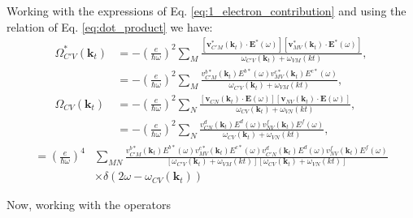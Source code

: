 \documentclass{article}
\newcommand{\kt}{\mathbf{k}_{t}}
\newcommand{\dw}{\delta(2\omega - \omega_{CV}(\kt))}
\begin{document}
Working with the expressions of Eq. \eqref{eq:1_electron_contribution} and using
the relation of Eq. \eqref{eq:dot_product} we have:
\begin{align*}\label{eq:omegaICV_omegaI*VpV}
\Omega^{*}_{C'V}(\kt) &= - \left(\frac{e}{\hbar\omega}\right)^{2}
\sum_{M} \frac{[\mathbf{v}^{*}_{C'M}(\kt) \cdot \mathbf{E}^{*}(\omega)]
[\mathbf{v}^{*}_{MV}(\kt)\cdot\mathbf{E}^{*}(\omega)]}{\omega_{C'V}(\kt)+\omega_{VM}(kt)}, \\
&= - \left(\frac{e}{\hbar\omega}\right)^{2}
\sum_{M} \frac{v^{b*}_{C'M}(\kt) E^{b*}(\omega)
v^{c*}_{MV}(\kt) E^{c*}(\omega)}{\omega_{C'V}(\kt)+\omega_{VM}(kt)}, \\
\Omega_{CV}(\kt) &= - \left(\frac{e}{\hbar\omega}\right)^{2}
\sum_{N} \frac{[\mathbf{v}_{CN}(\kt) \cdot \mathbf{E}(\omega)]
[\mathbf{v}_{NV}(\kt)\cdot\mathbf{E}(\omega)]}{\omega_{CV}(\kt)+\omega_{VN}(kt)},\\
&= - \left(\frac{e}{\hbar\omega}\right)^{2}
\sum_{N} \frac{v^{d}_{CN}(\kt) E^{d}(\omega)
v^{f}_{NV}(\kt) E^{f}(\omega)}{\omega_{CV}(\kt)+\omega_{VN}(kt)},
\end{align*}
\begin{align}
[\Omega_{CV}(\kt)\Omega^{*}_{C'V}(\kt)] = \left(\frac{e}{\hbar\omega}\right)^{4} &
\sum_{MN} \frac{v^{b*}_{C'M}(\kt) E^{b*}(\omega)v^{c*}_{MV}(\kt) E^{c*}(\omega)
v^{d}_{C'N}(\kt) E^{d}(\omega)v^{f}_{NV}(\kt) E^{f}(\omega)}
{[\omega_{C'V}(\kt)+\omega_{VM}(kt)][\omega_{CV}(\kt)+\omega_{VN}(kt)]} \nonumber \\
& \times \dw
\end{align}

Now, working with the operators

\end{document}
